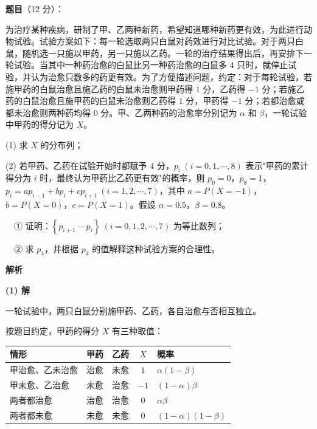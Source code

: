 \begin{answer}

\textbf{题目}（12 分）：

为治疗某种疾病，研制了甲、乙两种新药，希望知道哪种新药更有效，为此进行动物试验。试验方案如下：每一轮选取两只白鼠对药效进行对比试验。对于两只白鼠，随机选一只施以甲药，另一只施以乙药。一轮的治疗结果得出后，再安排下一轮试验。当其中一种药治愈的白鼠比另一种药治愈的白鼠多 $4$ 只时，就停止试验，并认为治愈只数多的药更有效。为了方便描述问题，约定：对于每轮试验，若施甲药的白鼠治愈且施乙药的白鼠未治愈则甲药得 $1$ 分，乙药得 $-1$ 分；若施乙药的白鼠治愈且施甲药的白鼠未治愈则乙药得 $1$ 分，甲药得 $-1$ 分；若都治愈或都未治愈则两种药均得 $0$ 分。甲、乙两种药的治愈率分别记为 $\alpha$ 和 $\beta$，一轮试验中甲药的得分记为 $X$。

  (1) 求 $X$ 的分布列；

  (2) 若甲药、乙药在试验开始时都赋予 $4$ 分，$p_i\ (i=0,1,\cdots,8)$ 表示"甲药的累计得分为 $i$ 时，最终认为甲药比乙药更有效"的概率，则 $p_0=0$，$p_8=1$，$p_i=ap_{i-1}+bp_i+cp_{i+1}\ (i=1,2,\cdots,7)$，其中 $a=P(X=-1)$，$b=P(X=0)$，$c=P(X=1)$。假设 $\alpha=0.5$，$\beta=0.8$。

  　① 证明：$\left\{p_{i+1}-p_i\right\}\ (i=0,1,2,\cdots,7)$ 为等比数列；

  　② 求 $p_4$，并根据 $p_4$ 的值解释这种试验方案的合理性。

\textbf{解析}

\par\medskip

\textbf{(1) 解}

一轮试验中，两只白鼠分别施甲药、乙药，各自治愈与否相互独立。

按题目约定，甲药的得分 $X$ 有三种取值：

\begin{center}
\begin{tabular}{lcccl}
\toprule
情形 & 甲药 & 乙药 & $X$ & 概率 \\
\midrule
甲治愈、乙未治愈 & 治愈 & 未愈 & $1$ & $\alpha(1-\beta)$ \\
甲未愈、乙治愈 & 未愈 & 治愈 & $-1$ & $(1-\alpha)\beta$ \\
两者都治愈 & 治愈 & 治愈 & $0$ & $\alpha\beta$ \\
两者都未愈 & 未愈 & 未愈 & $0$ & $(1-\alpha)(1-\beta)$ \\
\bottomrule
\end{tabular}
\end{center}


\end{answer}
